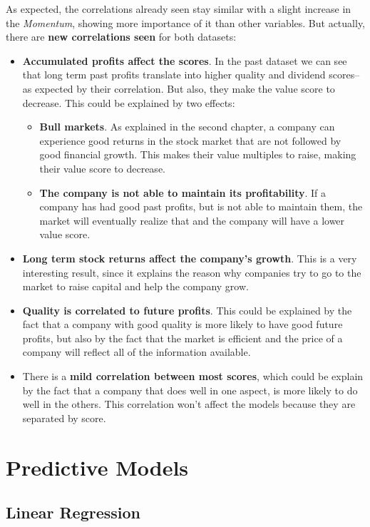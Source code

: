 \documentclass[11pt,english,a4paper,hidelinks]{book}
\begin{document}
\noindent As expected, the correlations already seen stay similar with a slight increase in the \textit{Momentum}, showing more importance of it than other variables. But actually, there are \textbf{new correlations seen} for both datasets:

\begin{itemize}
    \item  \textbf{Accumulated profits affect the scores}. In the past dataset we can see that long term past profits translate into higher quality and dividend scores-- as expected by their correlation. But also, they make the value score to decrease. This could be explained by two effects:
    \begin{itemize}
        \item \textbf{Bull markets}. As explained in the second chapter, a company can experience good returns in the stock market that are not followed by good financial growth. This makes their value multiples to raise, making their value score to decrease.
        \item \textbf{The company is not able to maintain its profitability}. If a company has had good past profits, but is not able to maintain them, the market will eventually realize that and the company will have a lower value score.
    \end{itemize}
    \item \textbf{Long term stock returns affect the company's growth}. This is a very interesting result, since it explains the reason why companies try to go to the market to raise capital and help the company grow.
    \item \textbf{Quality is correlated to future profits}. This could be explained by the fact that a company with good quality is more likely to have good future profits, but also by the fact that the market is efficient and the price of a company will reflect all of the information available.
    \item There is a \textbf{mild correlation between most scores}, which could be explain by the fact that a company that does well in one aspect, is more likely to do well in the others. This correlation won't affect the models because they are separated by score.
\end{itemize}

\section{Predictive Models}

\subsection{Linear Regression}
\end{document}
